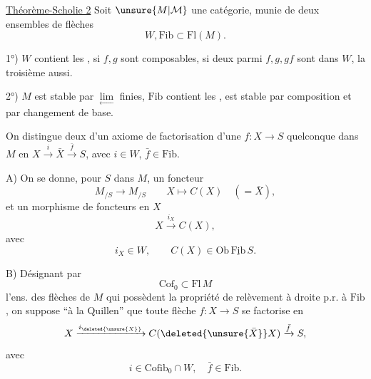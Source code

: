 \uline{Théorème-Scholie 2} Soit $\unsure{M|\mathcal M}$ une catégorie, munie de deux ensembles de flèches
\[
W,\mathrm{Fib}\subset\mathrm{Fl}(M).
\]

 1°) $W$ contient les ,  si $f,g$ sont composables, si deux parmi $f,g,gf$ sont dans $W$, la troisième aussi.

2°)  $M$ est stable par $\underset{\leftarrow}{\lim}$ finies, $\mathrm{Fib}$  contient les , est stable par composition et par changement de base.


On distingue deux   d'un axiome  de factorisation d'une $f:X\longrightarrow S$ quelconque dans $M$ en $X\xrightarrow{i}\bar X\xrightarrow{\bar f}S$, avec $i\in W$, $\bar f\in\mathrm{Fib}$.

A) On se donne, pour  $S$ dans $M$, un foncteur
\[
M_{/S}\longrightarrow M_{/S}\qquad X\longmapsto C(X)\quad(=\bar X),
\]
 et un morphisme de foncteurs en $X$
\[
X\xrightarrow{i_X}C(X),
\]
avec
\[
i_X\in W,\qquad C(X)\in\mathrm{Ob}\,\underline{\mathrm{Fib}}\,S.
\]

B) Désignant par
\[
\mathrm{Cof}_0\subset\mathrm{Fl}\,M
\]
l'ens. des flèches de $M$ qui possèdent la propriété de relèvement à droite p.r. à $\mathrm{Fib}$, on suppose ``à la Quillen'' que toute  flèche $f:X\longrightarrow S$ se factorise en
\[
X\xrightarrow{i_{\deleted{\unsure{X}}}}C(\deleted{\unsure{\bar X}}X)\xrightarrow{\bar f}S,
\]
avec
\[
i\in\mathrm{Cofib}_0\cap W,\quad \bar f\in\mathrm{Fib}.
\]
